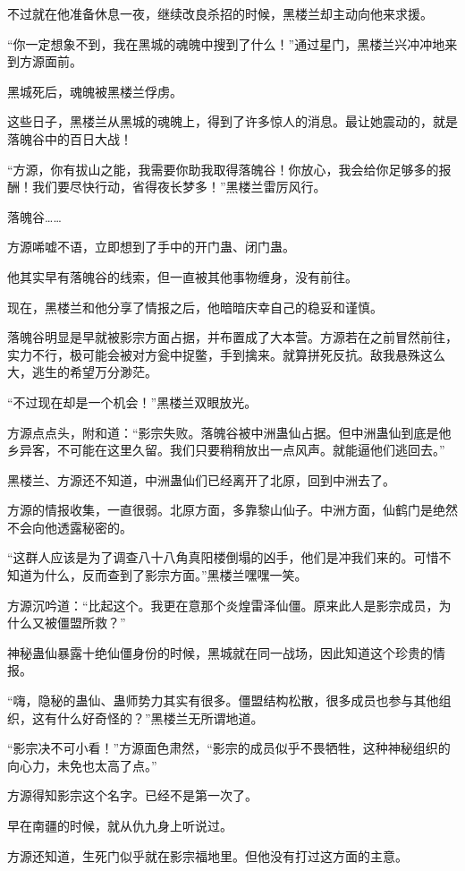 \begin{this_body}
不过就在他准备休息一夜，继续改良杀招的时候，黑楼兰却主动向他来求援。

“你一定想象不到，我在黑城的魂魄中搜到了什么！”通过星门，黑楼兰兴冲冲地来到方源面前。

黑城死后，魂魄被黑楼兰俘虏。

这些日子，黑楼兰从黑城的魂魄上，得到了许多惊人的消息。最让她震动的，就是落魄谷中的百日大战！

“方源，你有拔山之能，我需要你助我取得落魄谷！你放心，我会给你足够多的报酬！我们要尽快行动，省得夜长梦多！”黑楼兰雷厉风行。

落魄谷……

方源唏嘘不语，立即想到了手中的开门蛊、闭门蛊。

他其实早有落魄谷的线索，但一直被其他事物缠身，没有前往。

现在，黑楼兰和他分享了情报之后，他暗暗庆幸自己的稳妥和谨慎。

落魄谷明显是早就被影宗方面占据，并布置成了大本营。方源若在之前冒然前往，实力不行，极可能会被对方瓮中捉鳖，手到擒来。就算拼死反抗。敌我悬殊这么大，逃生的希望万分渺茫。

“不过现在却是一个机会！”黑楼兰双眼放光。

方源点点头，附和道：“影宗失败。落魄谷被中洲蛊仙占据。但中洲蛊仙到底是他乡异客，不可能在这里久留。我们只要稍稍放出一点风声。就能逼他们逃回去。”

黑楼兰、方源还不知道，中洲蛊仙们已经离开了北原，回到中洲去了。

方源的情报收集，一直很弱。北原方面，多靠黎山仙子。中洲方面，仙鹤门是绝然不会向他透露秘密的。

“这群人应该是为了调查八十八角真阳楼倒塌的凶手，他们是冲我们来的。可惜不知道为什么，反而查到了影宗方面。”黑楼兰嘿嘿一笑。

方源沉吟道：“比起这个。我更在意那个炎煌雷泽仙僵。原来此人是影宗成员，为什么又被僵盟所救？”

神秘蛊仙暴露十绝仙僵身份的时候，黑城就在同一战场，因此知道这个珍贵的情报。

“嗨，隐秘的蛊仙、蛊师势力其实有很多。僵盟结构松散，很多成员也参与其他组织，这有什么好奇怪的？”黑楼兰无所谓地道。

“影宗决不可小看！”方源面色肃然，“影宗的成员似乎不畏牺牲，这种神秘组织的向心力，未免也太高了点。”

方源得知影宗这个名字。已经不是第一次了。

早在南疆的时候，就从仇九身上听说过。

方源还知道，生死门似乎就在影宗福地里。但他没有打过这方面的主意。


\end{this_body}
